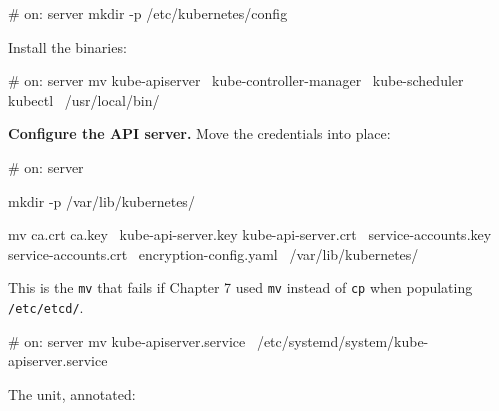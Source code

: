 \documentclass[11pt,oneside]{report}
\begin{document}
\begin{cmdlst}
# on: server
mkdir -p /etc/kubernetes/config
\end{cmdlst}

Install the
binaries:

\begin{cmdlst}
# on: server
{
  mv kube-apiserver \
    kube-controller-manager \
    kube-scheduler kubectl \
    /usr/local/bin/
}
\end{cmdlst}

\textbf{Configure
the API server.}
Move the credentials
into place:

\begin{cmdlst}
# on: server
{
  mkdir -p /var/lib/kubernetes/

  mv ca.crt ca.key \
    kube-api-server.key kube-api-server.crt \
    service-accounts.key service-accounts.crt \
    encryption-config.yaml \
    /var/lib/kubernetes/
}
\end{cmdlst}

This is the
\texttt{mv} that
fails if Chapter 7
used \texttt{mv}
instead of
\texttt{cp} when
populating
\texttt{/etc/etcd/}.

\begin{cmdlst}
# on: server
mv kube-apiserver.service \
  /etc/systemd/system/kube-apiserver.service
\end{cmdlst}

The unit, annotated:
\end{document}
